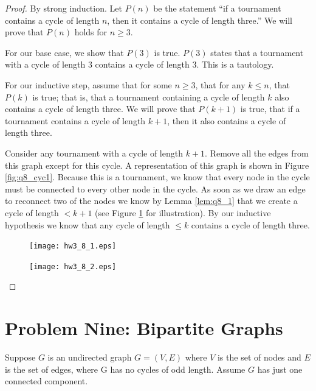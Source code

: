 \documentclass[10pt,letter]{article}
\begin{document}
\begin{proof} By strong induction. Let $P(n)$ be the statement ``if a tournament contains a cycle of length $n$, then it contains a cycle of length three.'' We will prove that $P(n)$ holds for $n \ge 3$. 

For our base case, we show that $P(3)$ is true. $P(3)$ states that a tournament with a cycle of length 3 contains a cycle of length 3. This is a tautology. 

For our inductive step, assume that for some $n \ge 3$, that for any $k \le n$, that $P(k)$ is true; that is, that a tournament containing a cycle of length $k$ also contains a cycle of length three. We will prove that $P(k+1)$ is true, that if a tournament contains a cycle of length $k+1$, then it also contains a cycle of length three.

Consider any tournament with a cycle of length $k+1$. Remove all the edges from this graph except for this cycle. A representation of this graph is shown in Figure \ref{fig:q8_cyc1}. Because this is a tournament, we know that every node in the cycle must be connected to every other node in the cycle. As soon as we draw an edge to reconnect two of the nodes we know by Lemma \ref{lem:q8_1} that we create a cycle of length $< k+1$ (see Figure \ref{fig:q8_cyc2} for illustration). By our inductive hypothesis we know that any cycle of length $\le k$ contains a cycle of length three. 

\begin{figure}[h]
\centering
\begin{minipage}{.5\textwidth}
  \centering
  \texttt{[image: hw3\_8\_1.eps]}
  \label{fig:q8_cyc1}
\end{minipage}%
\begin{minipage}{.5\textwidth}
  \centering
  \texttt{[image: hw3\_8\_2.eps]}
  \label{fig:q8_cyc2}
\end{minipage}
\end{figure}

\end{proof}

\section*{Problem Nine: Bipartite Graphs}

Suppose $G$ is an undirected graph $G = (V, E)$ where $V$ is the set of nodes and $E$ is the set of edges, where G has no cycles of odd length. Assume $G$ has just one connected component.
\end{document}
